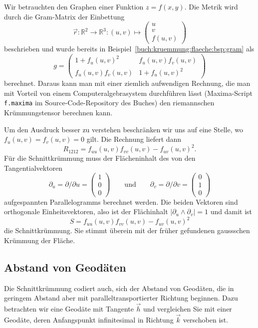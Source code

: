 \begin{beispiel}
Wir betrauchten den Graphen einer Funktion $z=f(x,y)$.
Die Metrik wird 
durch die Gram-Matrix der Einbettung
\[
\vec{r}
\colon
\mathbb{R}^2 \to \mathbb{R}^3
:
(u,v)
\mapsto 
\begin{pmatrix} u \\ v \\ f(u,v) \end{pmatrix}
\]
beschrieben und wurde bereits in
Beispiel~\ref{buch:kruemmung:flaeche:bsp:gram}
als
\[
g
=
\begin{pmatrix}
1 + f_u(u,v)^2    & f_u(u,v) f_v(u,v) \\
f_u(u,v) f_v(u,v) & 1 + f_u(u,v)^2
\end{pmatrix}
\]
berechnet.
Daraus kann man mit einer ziemlich aufwendigen Rechnung, die man
mit Vorteil von einem Computeralgebrasystem durchführen lässt
(Maxima-Script \texttt{f.maxima} im Source-Code-Repository des Buches)
den riemannschen Krümmungstensor berechnen kann.

Um den Ausdruck besser zu verstehen beschränken wir uns auf eine Stelle,
wo $f_u(u,v)=f_v(u,v)=0$ gilt.
Die Rechnung liefert dann
\[
R_{1212} = f_{uu}(u,v) f_{vv}(u,v) - f_{uv}(u,v)^2.
\]
Für die Schnittkrümmung muss der Flächeninhalt des von den Tangentialvektoren
\[
\partial_u
=
\partial/\partial u
=
\begin{pmatrix}1\\0\\0\end{pmatrix}
\qquad\text{und}\qquad
\partial_v
=
\partial/\partial v
=
\begin{pmatrix}0\\1\\0\end{pmatrix}
\]
aufgespannten Parallelogramms berechnet werden.
Die beiden Vektoren sind orthogonale Einheitsvektoren, also ist
der Flächinhalt $|\partial_u\wedge\partial_v|=1$ und damit ist
\[
S
=
f_{uu}(u,v) f_{vv}(u,v) - f_{uv}(u,v)^2
\]
die Schnittkrümmung.
Sie stimmt überein mit der früher gefundenen gaussschen Krümmung
der Fläche.
\end{beispiel}

%
%
\subsection{Abstand von Geodäten}

Die Schnittkrümmung codiert auch, sich der Abstand von Geodäten,
die in geringem Abstand aber mit paralleltransportierter Richtung
beginnen.
Dazu betrachten wir eine Geodäte mit Tangente $\vec{h}$ und
vergleichen Sie mit einer Geodäte, deren Anfangspunkt infinitesimal
in Richtung $\vec{k}$ verschoben ist.

